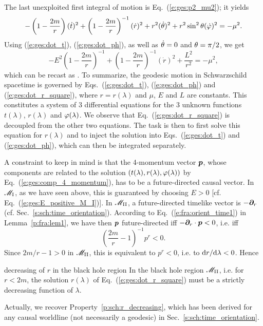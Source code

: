 The last unexploited first integral of motion is Eq.~(\ref{e:ges:p2_mu2}); it
yields
\[
   - \left( 1 - \frac{2m}{r} \right) (\dot{t})^2 +
   \left( 1 - \frac{2m}{r} \right) ^{-1}  (\dot{r})^2
   + r^2 (\dot{\theta})^2 + r^2 \sin^2\theta (\dot{\varphi})^2  = - \mu^2 .
\]
Using (\ref{e:ges:dot_t}), (\ref{e:ges:dot_ph}), as well as
$\dot{\theta}=0$ and $\theta=\pi/2$, we get
\[
    -  E^2 \left(1 - \frac{2m}{r} \right) ^{-1}
    +  \left( 1 - \frac{2m}{r} \right) ^{-1}  (\dot{r})^2
    +  \frac{L^2}{r^2} = - \mu^2 ,
\]
which can be recast as
\be \label{e:ges:dot_r_square}
     .
\ee
To summarize, the geodesic motion in Schwarzschild spacetime is governed by
Eqs.~(\ref{e:ges:dot_t}), (\ref{e:ges:dot_ph}) and (\ref{e:ges:dot_r_square}),
where $r=r(\lambda)$ and $\mu$, $E$ and $L$ are constants.
This constitutes a system of 3 differential equations for the 3 unknown
functions $t(\lambda)$, $r(\lambda)$ and $\varphi(\lambda)$.
We observe
that Eq.~(\ref{e:ges:dot_r_square}) is decoupled from the other two equations.
The task is then to first solve this equation for $r(\lambda)$ and to inject
the solution into Eqs.~(\ref{e:ges:dot_t}) and (\ref{e:ges:dot_ph}), which
can then be integrated separately.

A constraint to keep in mind is that the 4-momentum vector $\bm{p}$, whose
components are related to the solution $(t(\lambda), r(\lambda), \varphi(\lambda))$
by Eq.~(\ref{e:ges:comp_4_momentum}), has to be a future-directed causal vector.
In $\mathscr{M}_{\rm I}$, as we have seen above, this is guaranteed by choosing $E > 0$
[cf. Eq.~(\ref{e:ges:E_positive_M_I})]. In $\mathscr{M}_{\rm II}$, a future-directed
timelike vector is $-\bm{\partial}_r$ (cf. Sec.~\ref{s:sch:time_orientation}).
According to Eq.~(\ref{e:fra:orient_time1}) in Lemma~\ref{p:fra:lem1},
we have then
$\bm{p}$ future-directed iff $-\bm{\partial}_r\cdot\bm{p} < 0$, i.e. iff
\[
    \left(\frac{2m}{r} - 1  \right) ^{-1} p^r < 0  .
\]
Since $2m/r - 1 > 0$ in $\mathscr{M}_{\rm II}$, this is equivalent to $p^r < 0$, i.e.
to $\mathrm{d} r/\mathrm{d}\lambda < 0$. Hence
\begin{tprop}{decreasing of $r$ in the black hole region}{}
In the black hole region $\mathscr{M}_{\rm II}$, i.e. for $r<2m$,
the solution $r(\lambda)$ of Eq.~(\ref{e:ges:dot_r_square})
must be a strictly decreasing function of $\lambda$.
\end{tprop}
Actually, we recover Property~\ref{p:sch:r_decreasing}, which has been
derived for any causal worldline (not necessarily
a geodesic) in Sec.~\ref{s:sch:time_orientation}.

